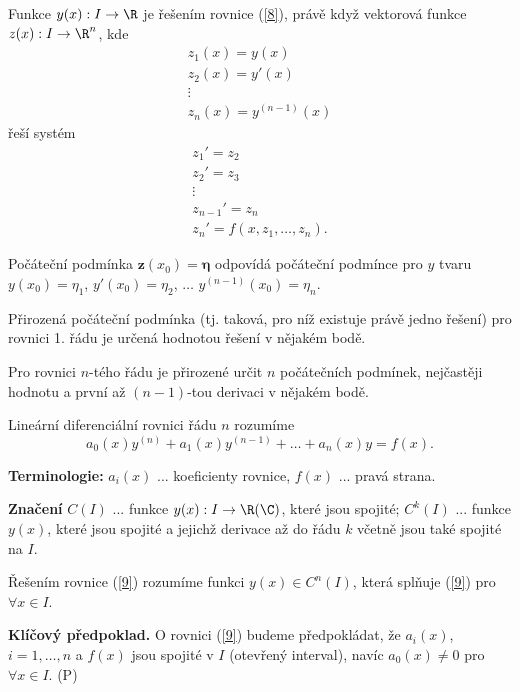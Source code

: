 \begin{poznamka} Funkce $y(x): I \to \R$ je řešením rovnice (\ref{8}), právě když vektorová funkce $z(x): I \to \R^n$, kde
\[
\begin{array}{l}
z_1(x) = y(x) \\
z_2(x) = y'(x) \\
\vdots \\
z_n(x) = y^{(n-1)}(x)
\end{array}
\]
řeší systém
\[
\begin{array}{l}
z_1' = z_2 \\
z_2' = z_3 \\
\vdots \\
z_{n-1}' = z_n \\
z_n' = f(x, z_1, \dots, z_n).
\end{array}
\]

Počáteční podmínka $\pmb{z}(x_0) = \pmb{\eta}$ odpovídá počáteční podmínce pro $y$ tvaru $y(x_0) = \eta_1$, $y'(x_0) = \eta_2$, $\ldots$ $y^{(n-1)}(x_0) = \eta_n$.
\end{poznamka}

\begin{poznamka}
Přirozená počáteční podmínka (tj. taková, pro níž existuje právě jedno řešení) pro rovnici 1. řádu je určená hodnotou řešení v nějakém bodě.

Pro rovnici $n$-tého řádu je přirozené určit $n$ počátečních podmínek, nejčastěji hodnotu a první až $(n-1)$-tou derivaci v nějakém bodě.
\end{poznamka}

\begin{definice}
Lineární diferenciální rovnici řádu $n$ rozumíme
\begin{equation}\label{9}
a_0(x) y^{(n)} + a_1(x) y^{(n-1)} + \dots + a_n(x) y = f(x).
\end{equation}
\end{definice}

\textbf{Terminologie:} $a_i(x)$ ... koeficienty rovnice, $f(x)$ ... pravá strana.

\textbf{Značení} $C(I)$ ... funkce $y(x): I \to \R(\C)$, které jsou spojité; $C^k(I)$ ... funkce $y(x)$, které jsou spojité a jejichž derivace až do řádu $k$ včetně jsou také spojité na $I$.

Řešením rovnice (\ref{9}) rozumíme funkci $y(x) \in C^n(I)$, která splňuje (\ref{9}) pro $\forall x \in I$.

\textbf{Klíčový předpoklad.}\label{P} O rovnici (\ref{9}) budeme předpokládat, že $a_i(x)$, $i = 1, \ldots, n$ a $f(x)$ jsou spojité v $I$ (otevřený interval), navíc $a_0(x) \neq 0$ pro $\forall x \in I$. \quad (P)

